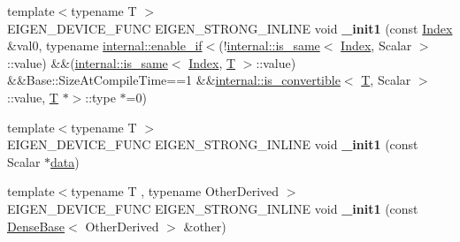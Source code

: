 \begin{DoxyCompactItemize}
\item 
\mbox{\label{class_eigen_1_1_plain_object_base_ae7f0019cd985508d564a4ecad568578b}} 
{\footnotesize template$<$typename T $>$ }\\E\+I\+G\+E\+N\+\_\+\+D\+E\+V\+I\+C\+E\+\_\+\+F\+U\+NC E\+I\+G\+E\+N\+\_\+\+S\+T\+R\+O\+N\+G\+\_\+\+I\+N\+L\+I\+NE void {\bfseries \+\_\+init1} (const \hyperlink{namespace_eigen_a62e77e0933482dafde8fe197d9a2cfde}{Index} \&val0, typename \hyperlink{struct_eigen_1_1internal_1_1enable__if}{internal\+::enable\+\_\+if}$<$(!\hyperlink{struct_eigen_1_1internal_1_1is__same}{internal\+::is\+\_\+same}$<$ \hyperlink{namespace_eigen_a62e77e0933482dafde8fe197d9a2cfde}{Index}, Scalar $>$\+::value) \&\&(\hyperlink{struct_eigen_1_1internal_1_1is__same}{internal\+::is\+\_\+same}$<$ \hyperlink{namespace_eigen_a62e77e0933482dafde8fe197d9a2cfde}{Index}, \hyperlink{group___sparse_core___module}{T} $>$\+::value) \&\&Base\+::\+Size\+At\+Compile\+Time==1 \&\&\hyperlink{struct_eigen_1_1internal_1_1is__convertible}{internal\+::is\+\_\+convertible}$<$ \hyperlink{group___sparse_core___module}{T}, Scalar $>$\+::value, \hyperlink{group___sparse_core___module}{T} $\ast$$>$\+::type $\ast$=0)
\item 
\mbox{\label{class_eigen_1_1_plain_object_base_aee83f415ba56df0e88cc27f6ffb19900}} 
{\footnotesize template$<$typename T $>$ }\\E\+I\+G\+E\+N\+\_\+\+D\+E\+V\+I\+C\+E\+\_\+\+F\+U\+NC E\+I\+G\+E\+N\+\_\+\+S\+T\+R\+O\+N\+G\+\_\+\+I\+N\+L\+I\+NE void {\bfseries \+\_\+init1} (const Scalar $\ast$\hyperlink{class_eigen_1_1_plain_object_base_ac25699535374b1854cf8494e44ad31b2}{data})
\item 
\mbox{\label{class_eigen_1_1_plain_object_base_a60a3568a35fcceadcf4cef655da09c7f}} 
{\footnotesize template$<$typename T , typename Other\+Derived $>$ }\\E\+I\+G\+E\+N\+\_\+\+D\+E\+V\+I\+C\+E\+\_\+\+F\+U\+NC E\+I\+G\+E\+N\+\_\+\+S\+T\+R\+O\+N\+G\+\_\+\+I\+N\+L\+I\+NE void {\bfseries \+\_\+init1} (const \hyperlink{group___core___module_class_eigen_1_1_dense_base}{Dense\+Base}$<$ Other\+Derived $>$ \&other)
\item 
\mbox{\label{class_eigen_1_1_plain_object_base_aec4cc5b9945456fe9994e0dda6e47008}} 
$$
\end{DoxyCompactItemize}
